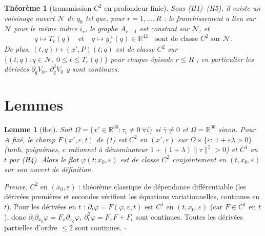 \documentclass[11pt,a4paper]{article}
\newtheorem{theoreme}{Th\'eor\`eme}
\newtheorem{lemme}{Lemme}
\theoremstyle{remark}
\newcommand{\R}{\mathbb R}
\newcommand{\norm}[1]{\lVert #1\rVert}
\begin{document}
\begin{theoreme}[transmission $C^2$ en profondeur finie]\label{thm:main}
Sous (H1)--(H5), il existe un voisinage ouvert $\mathcal N$ de $q_0$ tel que, pour $r=1,\dots,R$ : le franchissement a lieu sur $\mathcal N$ pour le m\^eme indice $i_r$, le graphe $A_{r+1}$ est constant sur $\mathcal N$, et
\[ q\mapsto T_r(q)\quad\text{et}\quad q\mapsto y_r^+(q)\in\R^{42}\quad\text{sont de classe }C^2\text{ sur }\mathcal N. \]
De plus, $(t,q)\mapsto(x',P)(t;q)$ est de classe $C^2$ sur $\{(t,q):q\in\mathcal N,\ 0\le t\le T_r(q)\}$ pour chaque \'episode $r\le R$ ; en particulier les d\'eriv\'ees $\partial_qV_0$, $\partial_q^2V_0$ y sont continues.
\end{theoreme}

\section{Lemmes}
\begin{lemme}[flot]\label{lem:A}Soit $\Omega=\{x'\in\R^{36}:\tau_i\neq0\ \forall i\}$ si $\bar\gamma\neq0$ et $\Omega=\R^{36}$ sinon. Pour $A$ fix\'e, le champ $F(x',\varepsilon,t)$ de (1) est $C^2$ en $(x',\varepsilon)$ sur $\Omega\times\{\varepsilon:\ 1+\varepsilon\bar\lambda>0\}$ (tanh, polyn\^omes, $c$ rationnel \`a d\'enominateur $1+(1+\lambda)\norm\tau^2>0$) et $C^1$ en $t$ par (H4). Alors le flot $\varphi(t;x_0,\varepsilon)$ est de classe $C^2$ \emph{conjointement} en $(t,x_0,\varepsilon)$ sur son ouvert de d\'efinition.\end{lemme}

\emph{Preuve.} $C^2$ en $(x_0,\varepsilon)$ : th\'eor\`eme classique de d\'ependance diff\'erentiable (les d\'eriv\'ees premi\`eres et secondes v\'erifient les \'equations variationnelles, continues en $t$). Pour les d\'eriv\'ees en $t$ : $\partial_t\varphi=F(\varphi,\varepsilon,t)$ est $C^1$ en $(t,x_0,\varepsilon)$ (car $F\in C^1$ en $t$), donc $\partial_t\partial_{x_0}\varphi=F_x\partial_{x_0}\varphi$, $\partial_t^2\varphi=F_xF+F_t$ sont continues. Toutes les d\'eriv\'ees partielles d'ordre $\le2$ sont continues. $\square$
\end{document}
